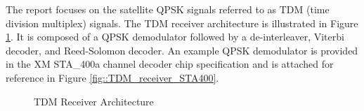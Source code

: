 \documentclass[conference,onecolumn]{IEEEtran}
\begin{document}

The report focuses on the satellite QPSK signals referred to as TDM (time division multiplex) signals. The TDM receiver architecture is illustrated in Figure \ref{fig::TDM_receiver2_8920000}. It is composed of a QPSK demodulator followed by a de-interleaver, Viterbi decoder, and Reed-Solomon decoder. An example QPSK demodulator is provided in the XM STA\_400a channel decoder chip specification and is attached for reference in Figure \ref{fig::TDM_receiver_STA400}. 

\begin{figure}[H]
	\centerline{}
	\caption{TDM Receiver Architecture \cite{marko_2012_us8667344b2}}
	\label{fig::TDM_receiver2_8920000}
\end{figure}
\end{document}
